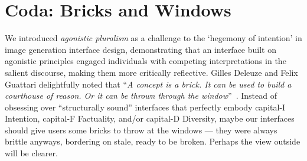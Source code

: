 \section{Coda: Bricks and Windows}
\label{conclusion}

We introduced \textit{agonistic pluralism} as a challenge to the `hegemony of intention' in image generation interface design, demonstrating that an interface built on agonistic principles engaged individuals with competing interpretations in the salient discourse, making them more critically reflective.
Gilles Deleuze and Felix Guattari delightfully noted that ``\textit{A concept is a brick. It can be used to build a courthouse of reason. Or it can be thrown through the window}''~\cite{deleuze_guattari_1987}.
Instead of obsessing over ``structurally sound'' interfaces that perfectly embody capital-I Intention, capital-F Factuality, and/or capital-D Diversity, maybe our interfaces should give users some bricks to throw at the windows --- they were always brittle anyways, bordering on stale, ready to be broken.
Perhaps the view outside will be clearer.




